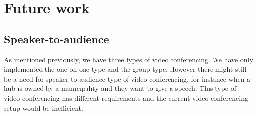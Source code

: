\documentclass{report}
\begin{document}


\chapter{Future work}
\section{Speaker-to-audience}
As mentioned previously, we have three types of video conferencing. We have only implemented the one-on-one type and
the group type. However there might still be a need for speaker-to-audience type of video conferencing, for instance
when a hub is owned by a municipality and they want to give a speech. This type of video conferencing has different
requirements and the current video conferencing setup would be inefficient.

\newpage
\end{document}
